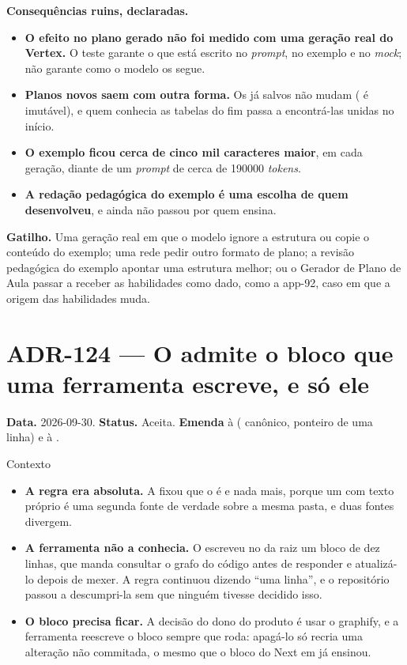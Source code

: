 \textbf{Consequências ruins, declaradas.}

\begin{itemize}
  \item \textbf{O efeito no plano gerado não foi medido com uma geração real do
    Vertex.} O teste garante o que está escrito no \emph{prompt}, no exemplo e no
    \emph{mock}; não garante como o modelo os segue.
  \item \textbf{Planos novos saem com outra forma.} Os já salvos não mudam
    ( é imutável), e quem conhecia as tabelas do fim passa a
    encontrá-las unidas no início.
  \item \textbf{O exemplo ficou cerca de cinco mil caracteres maior}, em cada
    geração, diante de um \emph{prompt} de cerca de \num{190000} \emph{tokens}.
  \item \textbf{A redação pedagógica do exemplo é uma escolha de quem
    desenvolveu}, e ainda não passou por quem ensina.
\end{itemize}

\textbf{Gatilho.} Uma geração real em que o modelo ignore a estrutura ou copie o
conteúdo do exemplo; uma rede pedir outro formato de plano; a revisão pedagógica do
exemplo apontar uma estrutura melhor; ou o Gerador de Plano de Aula passar a
receber as habilidades como dado, como a app-92, caso em que a origem das
habilidades muda.

\section{ADR-124 --- O  admite o bloco que uma ferramenta escreve, e só ele}
\label{adr:claude-md-bloco-de-ferramenta}

\textbf{Data.} 2026-09-30. \textbf{Status.} Aceita.
\textbf{Emenda} à  ( canônico,  ponteiro de
uma linha) e à .

\begin{especificacao}{Contexto}
\begin{itemize}
  \item \textbf{A regra era absoluta.} A  fixou que o  é
     e nada mais, porque um  com texto próprio é uma
    segunda fonte de verdade sobre a mesma pasta, e duas fontes divergem.
  \item \textbf{A ferramenta não a conhecia.} O 
    escreveu no  da raiz um bloco  de dez linhas,
    que manda consultar o grafo do código antes de responder e atualizá-lo depois
    de mexer. A regra continuou dizendo \enquote{uma linha}, e o repositório passou
    a descumpri-la sem que ninguém tivesse decidido isso.
  \item \textbf{O bloco precisa ficar.} A decisão do dono do produto é usar o
    graphify, e a ferramenta reescreve o bloco sempre que roda: apagá-lo só recria
    uma alteração não commitada, o mesmo que o bloco do Next em
     já ensinou.
\end{itemize}
\end{especificacao}

